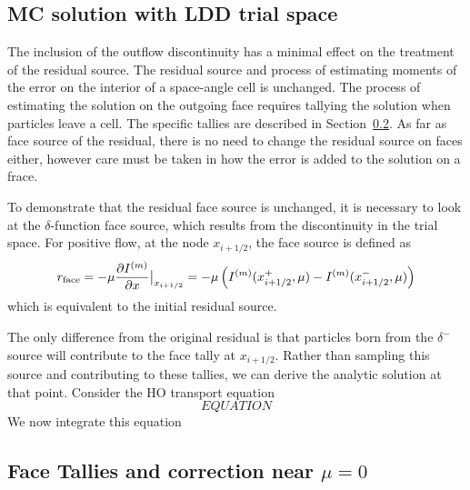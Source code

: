 
\subsection{MC solution with LDD trial space}
\label{sec:ldd_mc}

The inclusion of the outflow discontinuity has a minimal effect on the treatment of the
residual source. The residual source and process of estimating moments of
the error on the interior of a space-angle cell is unchanged.  The process of estimating
the solution on the outgoing face requires tallying the solution when particles leave a
cell. The specific
tallies are described in Section~\ref{sec:face_tallies}.  As far as face source of the
residual, there is no need to change the residual source on faces either, however care
must be taken in how the error is added to the solution on a frace.  

To demonstrate that the residual face source is unchanged, it is necessary to look at the
$\delta$-function face source, which results from the discontinuity in the trial space.  For
positive flow, at the node $x_{i+1/2}$, the face source is defined as
\begin{equation}
    \label{eq:res_face}
    r_{\text{face}} = -\mu \frac{\partial I^{(m)}}{\partial x}\big|_{x_{i+1/2}} =-\mu\left( I^{(m)}(x_{i+1/2}^+,\mu) -I^{(m)}(x_{i+1/2}^-,\mu) \right)
\end{equation}
which is equivalent to the initial residual source. 

The only difference from the original residual
is that particles born from the $\delta^-$ source will contribute to the face tally at $x_{i+1/2}$.  
Rather than sampling this source and contributing to these tallies, we can derive
the analytic solution at that point.  Consider the HO transport equation
\begin{equation}
    \label{eq:ho_face}
    EQUATION
\end{equation}
We now integrate this equation






\subsection{Face Tallies and correction near $\mu=0$}
\label{sec:face_tallies}

